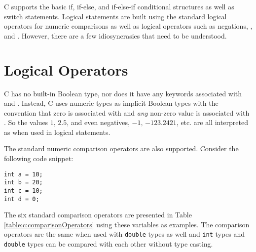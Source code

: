 

C supports the basic if, if-else, and if-else-if conditional structures as well as switch
statements.  Logical statements are built using the standard logical operators for
numeric comparisons as well as logical operators such as negations, \And, and 
\Or.  However, there are a few idiosyncrasies that need to be understood.

\section{Logical Operators}

C has no built-in Boolean type, nor does it have any keywords 
associated with \True and \False.  Instead, C uses numeric types as implicit 
Boolean types with the convention that zero is associated with \False and 
\emph{any} non-zero value is associated with \True.  So the values $1$, $2.5$, 
and even negatives, $-1$, $-123.2421$, etc. are all interpreted as \True when
used in logical statements.  

The standard numeric comparison operators are also supported.  Consider the 
following code snippet:

\begin{verbatim}
int a = 10;
int b = 20;
int c = 10;
int d = 0;
\end{verbatim}

The six standard comparison operators are presented in Table \ref{table:c:comparisonOperators}
using these variables as examples.  The comparison operators are the same when
used with \texttt{double} types as well and \texttt{int} types and 
\texttt{double} types can be compared with each other without type casting.

